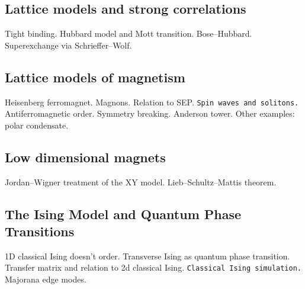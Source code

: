 \subsection{Lattice models and strong correlations}

Tight binding. Hubbard model and Mott transition. Bose--Hubbard. Superexchange via Schrieffer--Wolf.

\subsection{Lattice models of magnetism}

Heisenberg ferromagnet. Magnons. Relation to SEP. \verb|Spin waves and solitons.|
Antiferromagnetic order. Symmetry breaking. Anderson tower. Other examples: polar condensate.

\subsection{Low dimensional magnets}

Jordan--Wigner treatment of the XY model. Lieb--Schultz--Mattis theorem.

\subsection{The Ising Model and Quantum Phase Transitions}

1D classical Ising doesn't order. Transverse Ising as quantum phase transition. Transfer matrix and relation to 2d classical Ising. \verb|Classical Ising simulation.| Majorana edge modes.








